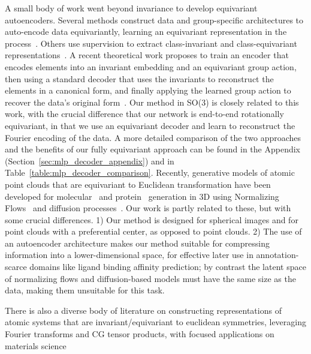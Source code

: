 A small body of work went beyond invariance to develop equivariant autoencoders. Several methods construct data and
group-specific architectures to auto-encode data equivariantly, learning an equivariant representation in the
process~\cite{hinton_transforming_2011, kosiorek_stacked_2019}. Others use supervision to extract class-invariant and
class-equivariant representations~\cite{feige_invariant-equivariant_2022}. A recent theoretical work proposes to train
an encoder that encodes elements into an invariant embedding and an equivariant group action, then using a standard
decoder that uses the invariants to reconstruct the elements in a canonical form, and finally applying the learned group
action to recover the data's original form~\cite{winter_unsupervised_2022}. Our method in SO(3) is closely related to
this work, with the crucial difference that our network is end-to-end rotationally equivariant, in that we use an
equivariant decoder and learn to reconstruct the Fourier encoding of the data. A more detailed comparison of the two
approaches and the benefits of our fully equivariant approach can be found in the Appendix
(Section~\ref{sec:mlp_decoder_appendix}) and in Table~\ref{table:mlp_decoder_comparison}.
Recently, generative models of atomic point clouds that are equivariant to Euclidean transformation have been developed
for molecular~\citep{hoogeboom_equivariant_2022} and protein~\citep{yim_se3_2023, watson_broadly_2022} generation in
3D using Normalizing Flows~\citep{hoogeboom_equivariant_2022} and diffusion processes~\citep{satorras_en_2022,
yim_se3_2023, watson_broadly_2022}. Our work is partly related to these, but with some crucial differences. 1) Our
method is designed for spherical images and for point clouds with a preferential center, as opposed to point clouds. 2)
The use of an autoencoder architecture makes our method suitable for compressing information into a lower-dimensional
space, for effective later use in annotation-scarce domains like ligand binding affinity prediction; by contrast the
latent space of normalizing flows and diffusion-based models must have the same size as the data, making them unsuitable
for this task.

There is also a diverse body of literature on constructing representations of atomic systems that are
invariant/equivariant to euclidean symmetries, leveraging Fourier transforms and CG tensor products, with focused
applications on materials science~\cite{drautz_atomic_2019, musil_physics-inspired_2021, uhrin_through_2021}\\

